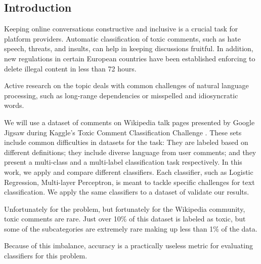 \documentclass[10.5pt]{article}
\begin{document}
\begin{multicols*}{2}
\section{Introduction}
Keeping online conversations constructive and inclusive is a crucial task for platform providers.  Automatic classification of toxic comments, such  as hate speech, threats, and insults, can help in  keeping discussions fruitful. In addition, new regulations in certain European countries have been  established enforcing to delete illegal content in  less than 72 hours.

Active research on the topic deals with common challenges of natural language processing,  such as long-range dependencies or misspelled  and idiosyncratic words.

We will use a dataset of comments on Wikipedia talk  pages presented by Google Jigsaw during Kaggle’s Toxic Comment Classification Challenge \cite{competitiontoxic}. These sets include common difficulties in datasets  for the task: They are labeled based on different definitions; they include diverse language from  user comments; and they present a  multi-class and a multi-label classification task respectively.
In this work, we apply and compare different classifiers.  Each classifier, such as Logistic Regression, Multi-layer Perceptron, is meant to tackle specific challenges for text classification. We apply  the same classifiers to a dataset of validate our results.

Unfortunately for the problem, but fortunately for the Wikipedia community, toxic comments are rare. Just over 10\% of this dataset is labeled as toxic, but some of the subcategories are extremely rare making up less than 1\% of the data.

Because of this imbalance, accuracy is a practically useless metric for evaluating classifiers for this problem.


\end{multicols*}
\end{document}
